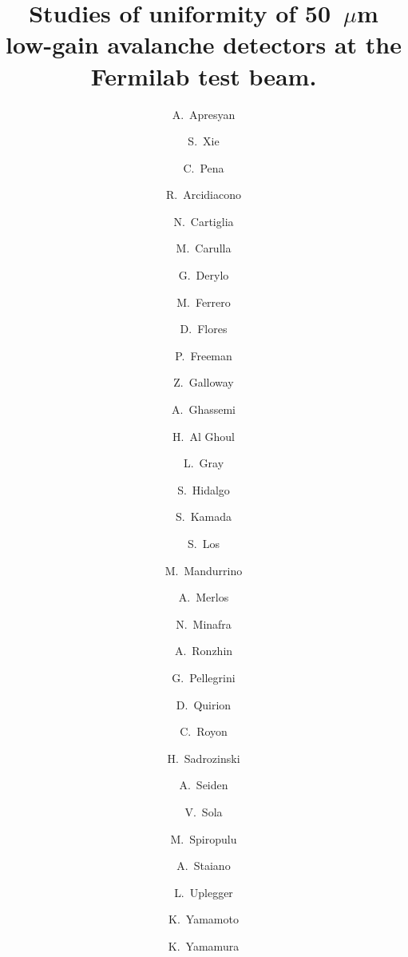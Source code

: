 \documentclass[preprint,1p]{elsarticle}
\begin{document}
\linenumbers

\begin{frontmatter}



\title{Studies of uniformity of 50~$\mu$m low-gain avalanche detectors
at the Fermilab test beam.}


\author[1]{A.~Apresyan}
\author[2]{S.~Xie}
\author[2]{C.~Pena}
\author[5,7]{R.~Arcidiacono}
\author[5]{N.~Cartiglia}
\author[8]{M.~Carulla}
\author[1]{G.~Derylo}
\author[5]{M.~Ferrero}
\author[8]{D.~Flores}
\author[4]{P.~Freeman}
\author[4]{Z.~Galloway}
\author[9]{A.~Ghassemi}
\author[3]{H.~Al Ghoul}
\author[1]{L.~Gray}
\author[8]{S.~Hidalgo}
\author[9]{S.~Kamada}
\author[1]{S.~Los}
\author[5]{M.~Mandurrino}
\author[8]{A.~Merlos}
\author[3]{N.~Minafra}
\author[1]{A.~Ronzhin}
\author[8]{G.~Pellegrini}
\author[8]{D.~Quirion}
\author[3]{C.~Royon}
\author[4]{H.~Sadrozinski}
\author[4]{A.~Seiden}
\author[5]{V.~Sola}
\author[2]{M.~Spiropulu}
\author[5]{A.~Staiano}
\author[1]{L.~Uplegger}
\author[9]{K.~Yamamoto}
\author[9]{K.~Yamamura}

\address[1]{Fermi National Accelerator Laboratory, Batavia, IL, USA}
\address[2]{California Institute of Technology, Pasadena, CA, USA}
\address[3]{University of Kansas, KS, USA}
\address[4]{SCIPP, University of California Santa Cruz, CA, USA}
\address[5]{INFN, Torino, Italy}
\address[6]{Universit\`a di Torino, Torino, Italy}
\address[7]{Universit\`a del Piemonte Orientale, Italy}
\address[8]{Centro Nacional de Microelectr\'{o}nica (IMB-CNM-CSIC), Barcelona, Spain}
\address[9]{Hamamatsu Photonics (HPK), Hamamatsu, Japan}


\end{frontmatter}
\end{document}
